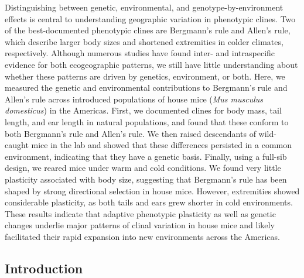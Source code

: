 \documentclass[]{article}
\begin{document}
Distinguishing between genetic, environmental, and
genotype-by-environment effects is central to understanding geographic
variation in phenotypic clines. Two of the best-documented phenotypic
clines are Bergmann's rule and Allen's rule, which describe larger body
sizes and shortened extremities in colder climates, respectively.
Although numerous studies have found inter- and intraspecific evidence
for both ecogeographic patterns, we still have little understanding
about whether these patterns are driven by genetics, environment, or
both. Here, we measured the genetic and environmental contributions to
Bergmann's rule and Allen's rule across introduced populations of house
mice (\emph{Mus musculus domesticus}) in the Americas. First, we
documented clines for body mass, tail length, and ear length in natural
populations, and found that these conform to both Bergmann's rule and
Allen's rule. We then raised descendants of wild-caught mice in the lab
and showed that these differences persisted in a common environment,
indicating that they have a genetic basis. Finally, using a full-sib
design, we reared mice under warm and cold conditions. We found very
little plasticity associated with body size, suggesting that Bergmann's
rule has been shaped by strong directional selection in house mice.
However, extremities showed considerable plasticity, as both tails and
ears grew shorter in cold environments. These results indicate that
adaptive phenotypic plasticity as well as genetic changes underlie major
patterns of clinal variation in house mice and likely facilitated their
rapid expansion into new environments across the Americas.

\newpage

\hypertarget{introduction}{%
\subsection{Introduction}\label{introduction}}
\end{document}
